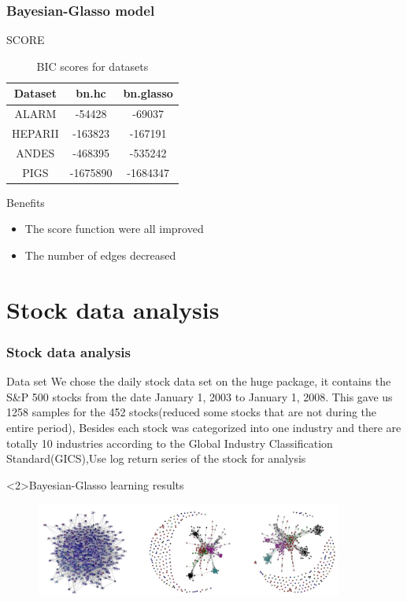 \documentclass{beamer}
\begin{document}
\begin{frame}
\frametitle{Bayesian-Glasso model}
  \begin{block}{SCORE}
\begin{table}[h!]\large
  \caption{BIC scores for datasets}
\begin{center}
    \begin{tabular}{| c | c| c | }
    \hline
    Dataset& bn.hc &  bn.glasso\\
    \hline
ALARM &-54428&-69037\\
HEPARII&-163823&-167191\\
ANDES&-468395&-535242\\
PIGS &-1675890&-1684347\\
\hline
\end{tabular}
  \end{center}
\end{table}
\end{block}
  \begin{block}{Benefits}
    \begin{itemize}
        \item  The score function were all improved
        \item  The number of edges decreased

    \end{itemize}
  \end{block}

\end{frame}


\section {Stock data analysis}

\begin{frame}
\frametitle{Stock data analysis}
\begin{block}{Data set}
\small{We chose the daily stock data set on the huge package, it contains the S\&P 500 stocks from the date January 1, 2003 to January 1, 2008. This gave us 1258 samples for the 452 stocks(reduced some stocks that are not during the entire period), Besides each stock was categorized into one industry and there are totally 10 industries according to the Global Industry Classification Standard(GICS),Use log return series of the stock for analysis}
\end{block}

\begin{block}<2>{Bayesian-Glasso learning results}
\begin{figure}
     \includegraphics[width=0.9\textwidth, height=0.4\textheight]{stock.jpg}
    \end{figure}
\end{block}

\end{frame}
\end{document}
